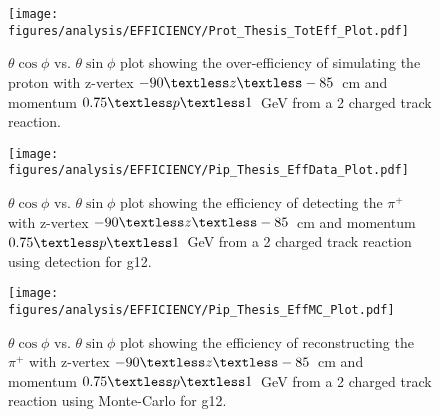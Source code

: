 %
\begin{figure}[h!]\begin{center}
\texttt{[image: \\figures/analysis/EFFICIENCY/Prot\_Thesis\_TotEff\_Plot.pdf]}
\caption[$\theta \cos\phi$ vs. $\theta \sin\phi$ plot showing the over-efficiency of simulating the proton with z-vertex $-90\textless z\textless-85$~cm and momentum $0.75\textless p \textless 1$~GeV from a 2 charged track reaction]{\label{fig:toteff_prot} $\theta \cos\phi$ vs. $\theta \sin\phi$ plot showing the over-efficiency of simulating the proton with z-vertex $-90\textless z\textless-85$~cm and momentum $0.75\textless p \textless 1$~GeV from a 2 charged track reaction.}
\end{center}\end{figure}
\begin{figure}[h!]\begin{center}
\texttt{[image: \\figures/analysis/EFFICIENCY/Pip\_Thesis\_EffData\_Plot.pdf]}
\caption[$\theta \cos\phi$ vs. $\theta \sin\phi$ plot showing the efficiency of detecting the $\pi^+$ with z-vertex $-90\textless z\textless-85$~cm and momentum $0.75\textless p \textless 1$~GeV from a 2 charged track reaction using  detection for g12]{\label{fig:eff_pip_data} $\theta \cos\phi$ vs. $\theta \sin\phi$ plot showing the efficiency of detecting the $\pi^+$ with z-vertex $-90\textless z\textless-85$~cm and momentum $0.75\textless p \textless 1$~GeV from a 2 charged track reaction using  detection for g12.}
\end{center}\end{figure}
%
\begin{figure}[h!]\begin{center}
\texttt{[image: \\figures/analysis/EFFICIENCY/Pip\_Thesis\_EffMC\_Plot.pdf]}
\caption[$\theta \cos\phi$ vs. $\theta \sin\phi$ plot showing the efficiency of reconstructing the $\pi^+$ with z-vertex $-90\textless z\textless-85$~cm and momentum $0.75\textless p \textless 1$~GeV from a 2 charged track reaction using  Monte-Carlo for g12]{\label{fig:eff_pip_MC} $\theta \cos\phi$ vs. $\theta \sin\phi$ plot showing the efficiency of reconstructing the $\pi^+$ with z-vertex $-90\textless z\textless-85$~cm and momentum $0.75\textless p \textless 1$~GeV from a 2 charged track reaction using  Monte-Carlo for g12.}
\end{center}\end{figure}
%
